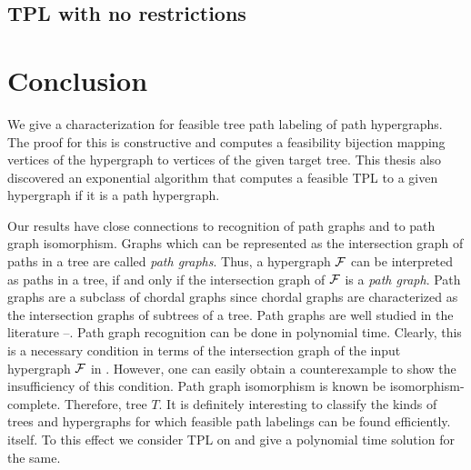 \documentclass[MS]             %
              {iitmdiss_as}    %
\begin{document}
\section{ TPL with no restrictions}


\chapter{Conclusion}
\label{sec:conclusion}

We give a characterization for feasible tree path labeling of path
hypergraphs. The proof for this is constructive and computes a
feasibility bijection mapping vertices of the hypergraph to vertices
of the given target tree. This thesis also discovered an exponential algorithm
that computes a feasible TPL to a given hypergraph if it is a path hypergraph.

Our results have close connections to recognition of path graphs and
to path graph isomorphism.  Graphs which can be represented as the
intersection graph of paths in a tree are called {\em path
  graphs}\cite{mcg04}. Thus, a hypergraph ${\cal F}$ can be interpreted as
paths in a tree, if and only if the intersection graph of ${\cal F}$ is a
{\em path graph}. Path graphs are a subclass of chordal graphs since
chordal graphs are characterized as the intersection graphs of
subtrees of a tree\cite{mcg04}.  Path graphs are well studied in the
literature \cite{plr70}--\cite{mcg04}.  Path graph recognition can be done in
polynomial time\cite{gav78,aas93}.  Clearly, this is a necessary
condition in terms of the intersection graph of the input hypergraph
${\cal F}$ in \FTPL. However, one can easily obtain a counterexample to
show the insufficiency of this condition.  Path graph isomorphism is known be
isomorphism-complete\cite{kklv10}. Therefore,  tree $T$.  It is
  definitely interesting to classify the kinds of trees and
  hypergraphs for which feasible path labelings can be
found efficiently.   itself.
 To this effect we consider TPL on {\kstar} and give a polynomial time
 solution for the same. 
\end{document}
